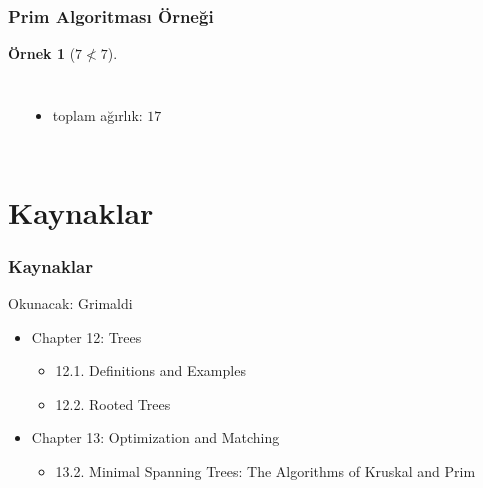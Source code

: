 \documentclass[dvipsnames]{beamer}
\theoremstyle{definition}
\theoremstyle{example}
\newtheorem{ornek}[theorem]{Örnek}
\theoremstyle{plain}
\begin{document}
\begin{frame}
  \frametitle{Prim Algoritması Örneği}

  \begin{ornek}[$7 \nless 7$]
    \begin{columns}
      \begin{center}
      \end{center}

      \begin{itemize}
        \item toplam ağırlık: $17$
      \end{itemize}
    \end{columns}
  \end{ornek}
\end{frame}

\section*{Kaynaklar}

\begin{frame}
  \frametitle{Kaynaklar}

  \begin{block}{Okunacak: Grimaldi}
    \begin{itemize}
      \item Chapter 12: Trees
      \begin{itemize}
        \item 12.1. \alert{Definitions and Examples}
        \item 12.2. \alert{Rooted Trees}
      \end{itemize}
      \item Chapter 13: Optimization and Matching
      \begin{itemize}
        \item 13.2. \alert{Minimal Spanning Trees: The Algorithms of Kruskal and Prim}
      \end{itemize}
    \end{itemize}
  \end{block}
\end{frame}
\end{document}
